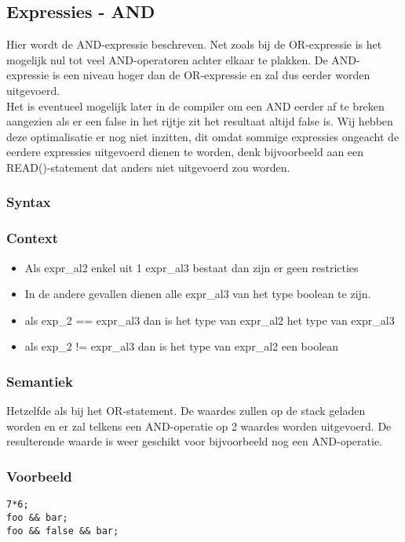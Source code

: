 \documentclass[]{article}
\begin{document}
\subsection{Expressies - AND}
Hier wordt de AND-expressie beschreven. Net zoals bij de OR-expressie is het mogelijk nul tot veel AND-operatoren achter elkaar te plakken. De AND-expressie is een niveau hoger dan de OR-expressie en zal dus eerder worden uitgevoerd. \\
Het is eventueel mogelijk later in de compiler om een AND eerder af te breken aangezien als er een false in het rijtje zit het resultaat altijd false is. Wij hebben deze optimalisatie er nog niet inzitten, dit omdat sommige expressies ongeacht de eerdere expressies uitgevoerd dienen te worden, denk bijvoorbeeld aan een READ()-statement dat anders niet uitgevoerd zou worden.
\subsubsection{Syntax}

\subsubsection{Context}
\begin{itemize}
\item Als expr\_al2 enkel uit 1 expr\_al3 bestaat dan zijn er geen restricties
\item In de andere gevallen dienen alle expr\_al3 van het type boolean te zijn.
\item als exp\_2 == expr\_al3 dan is het type van expr\_al2 het type van expr\_al3
\item als exp\_2 != expr\_al3 dan is het type van expr\_al2 een boolean
\end{itemize}
\subsubsection{Semantiek}
Hetzelfde als bij het OR-statement. De waardes zullen op de stack geladen worden en er zal telkens een AND-operatie op 2 waardes worden uitgevoerd. De resulterende waarde is weer geschikt voor bijvoorbeeld nog een AND-operatie.
\subsubsection{Voorbeeld}
\begin{lstlisting}[style=SELMA]
7*6;
foo && bar;
foo && false && bar;
\end{lstlisting}
\end{document}
